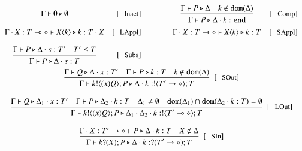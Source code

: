 \[
\begin{array}{crccr}
	\Gtprocess{\inact}{\es} & \trule{Inact}
	&\qquad&
	\tree{
		\Gtprocess{P}{\Delta} \quad k \notin \dom{\Delta}
	}{
		\Gtprocess{P}{\Delta \cat k:\tinact}
	} & \trule{Comp}
	\\[4mm]

	\tprocess{\Gamma \cat \X: \lhot{T}}{\appl{X}{k}}{k:T \cat X} & \trule{LAppl}
	& &
	\tprocess{\Gamma \cat \X: \shot{T}}{\appl{X}{k}}{k:T} & \trule{SAppl}
	\\[4mm]

	\tree{
		\Gtprocess{P}{\Delta \cat s: T'} \quad T' \subt T
	}{
		\Gtprocess{P}{\Delta \cat s: T}
	} & \trule{Subs}
	\\[4mm]


	\multicolumn{5}{c}{
		\tree{
			\Gtprocess{Q}{\Delta \cat x:T'} \quad \Gtprocess{P}{k:T}
			\quad
			k \notin \dom{\Delta}
		}{
			\Gtprocess{\bout{k}{\abs{x} Q} P}{\Delta \cat k: \btout{\shot{T'}} T}
		}
	\ \ \trule{SOut}
	}
	\\[7mm]

	\multicolumn{5}{c}{
		\tree{
			\Gtprocess{Q}{\Delta_1 \cat x:T'} \quad \Gtprocess{P}{\Delta_2 \cat k:T}
			\quad
			\Delta_1 \not= \es
			\quad
			\dom{\Delta_1} \cap \dom{\Delta_2 \cat k:T} = \es
		}{
			\Gtprocess{\bout{k}{\abs{x} Q} P}{\Delta_1 \cat \Delta_2 \cat k: \btout{\lhot{T'}} T}
		}
	\ \ \trule{LOut}
	}
	\\[7mm]




	\multicolumn{5}{c}{
		\tree{
			\tprocess{\Gamma \cat \X: \shot{T'}}{P}{\Delta \cat k: T} \quad \X \notin \Delta
		}{
			\tprocess{\Gamma}{\binp{k}{\X} P}{\Delta \cat k: \btinp{\shot{T'}} T}
		}\ \ \trule{SIn}
	}
	\\[7mm]


\end{array}\]
